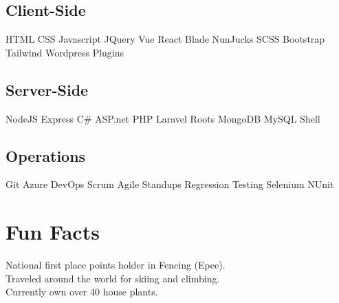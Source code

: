 \documentclass[]{deedy-resume-openfont}
\begin{document}
\begin{minipage}[t]{0.26\textwidth}
\subsection{Client-Side}
HTML \textbullet{}   CSS \textbullet{} Javascript \textbullet{} JQuery \textbullet{} Vue \textbullet{} React \textbullet{} Blade \textbullet{} NunJucks \textbullet{} SCSS \textbullet{} Bootstrap \textbullet{} Tailwind \textbullet{} Wordpress Plugins \\
\sectionsep

\subsection{Server-Side}
NodeJS \textbullet{} Express \textbullet{} C\# \textbullet{} ASP.net \textbullet{} PHP \textbullet{} Laravel \textbullet{} Roots \textbullet{} MongoDB \textbullet{} MySQL \textbullet{} Shell \\
\sectionsep

\subsection{Operations}
Git \textbullet{} Azure DevOps \textbullet{} Scrum \textbullet{} Agile \textbullet{} Standups \textbullet{} Regression Testing \textbullet{} Selenium \textbullet{} NUnit \\
\sectionsep



\section{Fun Facts}
National first place points holder in Fencing (Epee). \\
\paragraphsep
Traveled around the world for skiing and climbing. \\
\paragraphsep
Currently own over 40 house plants. \\

\sectionsep


%
%

\end{minipage} 
\hfill
\end{document}
